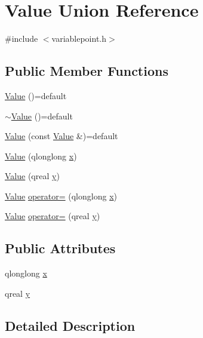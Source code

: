 \hypertarget{union_value}{}\section{Value Union Reference}
\label{union_value}


{\ttfamily \#include $<$variablepoint.\+h$>$}

\subsection*{Public Member Functions}
\begin{DoxyCompactItemize}
\item 
\hyperlink{union_value_aaa69c4878b9f1ab0326c0f0c845e6774}{Value} ()=default
\item 
\hyperlink{union_value_a32491c4a210c7d54994acd8d32ebc4ac}{$\sim$\+Value} ()=default
\item 
\hyperlink{union_value_a397d394758404901850fab53cfb9a472}{Value} (const \hyperlink{union_value}{Value} \&)=default
\item 
\hyperlink{union_value_a98460815363a07f2531d74556e55a60f}{Value} (qlonglong \hyperlink{union_value_a2964c534a94cb966919c34091dfbf7e4}{x})
\item 
\hyperlink{union_value_a1359939652a4c5511b40f779ef3d876e}{Value} (qreal \hyperlink{union_value_aad3217882d8e870d8319bb6273211193}{y})
\item 
\hyperlink{union_value}{Value} \hyperlink{union_value_a8609700cccf289225bb3f4cc81ad62fc}{operator=} (qlonglong \hyperlink{union_value_a2964c534a94cb966919c34091dfbf7e4}{x})
\item 
\hyperlink{union_value}{Value} \hyperlink{union_value_a48f1945b941a44edf8459aab09350d90}{operator=} (qreal \hyperlink{union_value_aad3217882d8e870d8319bb6273211193}{y})
\end{DoxyCompactItemize}
\subsection*{Public Attributes}
\begin{DoxyCompactItemize}
\item 
qlonglong \hyperlink{union_value_a2964c534a94cb966919c34091dfbf7e4}{x}
\item 
qreal \hyperlink{union_value_aad3217882d8e870d8319bb6273211193}{y}
\end{DoxyCompactItemize}


\subsection{Detailed Description}


